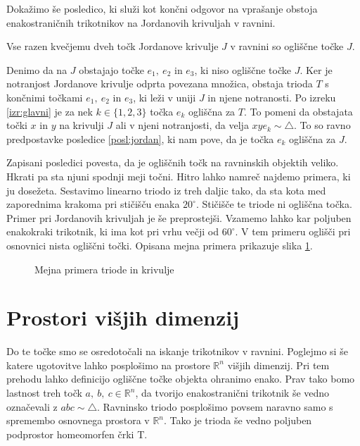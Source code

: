 \documentclass[mat1]{fmfdelo}
\newcommand{\R}{\mathbb R}
\begin{document}
Dokažimo še posledico, ki služi kot končni odgovor na vprašanje obstoja enakostraničnih trikotnikov na Jordanovih krivuljah v ravnini.
\begin{posledica}
Vse razen kvečjemu dveh točk Jordanove krivulje $J$ v ravnini so ogliščne točke $J$.
\end{posledica}
\proof
Denimo da na $J$ obstajajo točke $e_1,\ e_2$ in $e_3$, ki niso ogliščne točke $J$. Ker je notranjost Jordanove krivulje odprta povezana množica, obstaja trioda $T$ s končnimi točkami $e_1,\ e_2$ in $e_3$, ki leži v uniji $J$ in njene notranosti. Po izreku \ref{izr:glavni} je za nek $k \in \{1, 2, 3\}$ točka $e_k$ ogliščna za $T$. To pomeni da obstajata točki $x$ in $y$ na krivulji $J$ ali v njeni notranjosti, da velja $xye_k \sim \triangle$. To so ravno predpostavke posledice \ref{posl:jordan}, ki nam pove, da je točka $e_k$ ogliščna za $J$.
\endproof

Zapisani posledici povesta, da je ogliščnih točk na ravninskih objektih veliko. Hkrati pa sta njuni spodnji meji točni. Hitro lahko namreč najdemo primera, ki ju dosežeta. Sestavimo linearno triodo iz treh daljic tako, da sta kota med zaporednima krakoma pri stičišču enaka $20^\circ$. Stičišče te triode ni ogliščna točka. Primer pri Jordanovih krivuljah je še preprostejši. Vzamemo lahko kar poljuben enakokraki trikotnik, ki ima kot pri vrhu večji od $60^\circ$. V tem primeru oglišči pri osnovnici nista ogliščni točki. Opisana mejna primera prikazuje slika \ref{fig:mejna_primera}.

\begin{figure}[h!]
\centering
{}
\caption{Mejna primera triode in krivulje}
\label{fig:mejna_primera}
\end{figure}

\section{Prostori višjih dimenzij}
Do te točke smo se osredotočali na iskanje trikotnikov v ravnini. Poglejmo si še katere ugotovitve lahko posplošimo na prostore $\R^n$ višjih dimenzij. Pri tem prehodu lahko definicijo ogliščne točke objekta ohranimo enako. Prav tako bomo lastnost treh točk $a,\ b,\ c \in \R^n$, da tvorijo enakostranični trikotnik še vedno označevali z $abc \sim \triangle$. Ravninsko triodo posplošimo povsem naravno samo s spremembo osnovnega prostora v $\R^n$. Tako je trioda še vedno poljuben podprostor homeomorfen črki T. 
\end{document}
